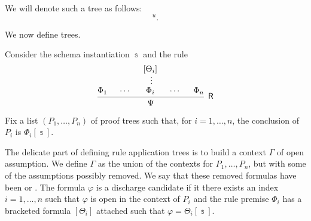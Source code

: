 \begin{definition}
\begin{thmenum}[resume=def:natural_deduction_proof_tree]
    We will denote such a tree as follows:
    \begin{equation*}
      [\varphi]^u.
    \end{equation*}

     We now define  trees.

    Consider the schema instantiation \( \Bbbs \) and the rule
    \begin{equation*}
      \begin{prooftree}
        \hypo{ \Phi_1 }
        \hypo{ \cdots }
        \hypo{ [\Theta_i] }
        \ellipsis {} { \Phi_i }
        \hypo{ \cdots }
        \hypo{ \Phi_n }
        \infer5[\logic{R}]{ \Psi }
      \end{prooftree}
    \end{equation*}

    Fix a list \( (P_1, \ldots, P_n) \) of proof trees such that, for \( i = 1, \ldots, n \), the conclusion of \( P_i \) is \( \Phi_i[\Bbbs] \).

    The delicate part of defining rule application trees is to build a context \( \Gamma \) of open assumption. We define \( \Gamma \) as the union of the contexts for \( P_1, \ldots, P_n \), but with some of the assumptions possibly removed. We say that these removed formulas have been  or . The formula \( \varphi \) is a discharge candidate if it there exists an index \( i = 1, \ldots, n \) such that \( \varphi \) is open in the context of \( P_i \) and the rule premise \( \Phi_i \) has a bracketed formula \( [\Theta_i] \) attached such that \( \varphi = \Theta_i[\Bbbs] \).


\end{thmenum}
\end{definition}
